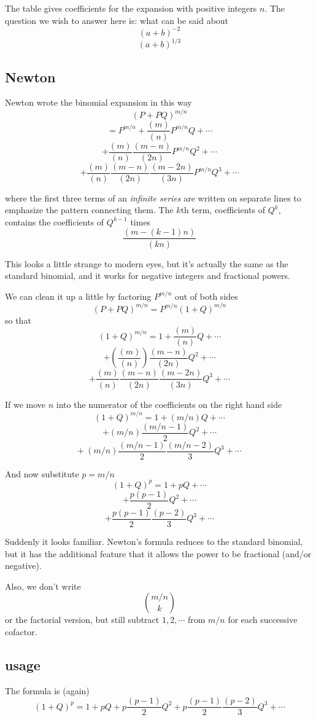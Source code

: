 \documentclass[11pt, oneside]{article}
\begin{document}
The table gives coefficients for the expansion with positive integers $n$.  The question we wish to answer here is:  what can be said about 
\[ (a + b)^{-2} \]
\[ (a + b)^{1/3} \]

\subsection*{Newton}

Newton wrote the binomial expansion in this way
\[ (P + PQ)^{m/n} \]
\[ = P^{m/n} + \frac{(m)}{(n)}P^{m/n}Q + \cdots \]
\[ + \frac{(m)}{(n)}\frac{(m-n)}{(2n)}P^{m/n}Q^2 + \cdots \]
\[ + \frac{(m)}{(n)}\frac{(m-n)}{(2n)}\frac{(m-2n)}{(3n)}P^{m/n}Q^3 + \cdots \] 

where the first three terms of an \emph{infinite series} are written on separate lines to emphasize the pattern connecting them.  The $k$th term, coefficients of $Q^k$, contains the coefficients of $Q^{k-1}$ times 
\[ \frac{(m-(k-1)n)}{(kn)} \]

This looks a little strange to modern eyes, but it's actually the same as the standard binomial, and it works for negative integers and fractional powers.

We can clean it up a little by factoring $P^{m/n}$ out of both sides
\[ (P + PQ)^{m/n} = P^{m/n}(1 + Q)^{m/n} \]
so that
\[ (1 + Q)^{m/n} = 1 + \frac{(m)}{(n)}Q + \cdots \]
\[ + (\frac{(m)}{(n)}) \frac{(m-n)}{(2n)}Q^2 + \cdots \]
\[  + \frac{(m)}{(n)}\frac{(m-n)}{(2n)}\frac{(m-2n)}{(3n)}Q^3 + \cdots \]

If we move $n$ into the numerator of the coefficients on the right hand side
\[ (1 + Q)^{m/n} = 1 + (m/n)Q + \cdots \]
\[ + (m/n)\frac{(m/n-1)}{2}Q^2 + \cdots \]
\[ + \ (m/n)\frac{(m/n-1)}{2}\frac{(m/n-2)}{3}Q^3 + \cdots \]

And now substitute $p = m/n$
\[ (1 + Q)^p = 1 + pQ + \cdots \]
\[ + \frac{p(p-1)}{2}Q^2 + \cdots \]
\[ +  \frac{p(p-1)}{2}\frac{(p-2)}{3}Q^3 + \cdots \]

Suddenly it looks familiar.  Newton's formula reduces to the standard binomial, but it has the additional feature that it allows the power to be fractional (and/or negative).  

Also, we don't write 
\[ {m/n}\choose{k} \]
or the factorial version, but still subtract $1,2,\cdots$ from $m/n$ for each successive cofactor.

\subsection*{usage}
The formula is (again)
\[ (1 + Q)^p = 1 + pQ + p\frac{(p-1)}{2}Q^2 + p\frac{(p-1)}{2}\frac{(p-2)}{3}Q^3 + \cdots \]
\end{document}
